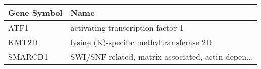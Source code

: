 \begin{tabular}{ll}
\toprule
Gene Symbol &                                               Name \\
\midrule
       ATF1 &                  activating transcription factor 1 \\
      KMT2D &           lysine (K)-specific methyltransferase 2D \\
    SMARCD1 & SWI/SNF related, matrix associated, actin depen... \\
\bottomrule
\end{tabular}
